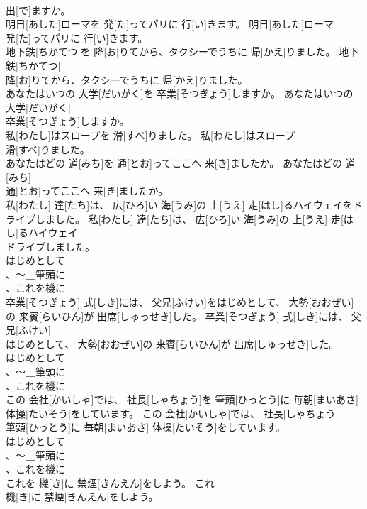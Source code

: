 \documentclass[8pt]{extreport}
\begin{document}
\begin{CJK}{UTF8}{min}
\\	出[で]ますか。	
\\	明日[あした]ローマを 発[た]ってパリに 行[い]きます。	明日[あした]ローマ
\\	発[た]ってパリに 行[い]きます。	
\\	地下鉄[ちかてつ]を 降[お]りてから、タクシーでうちに 帰[かえ]りました。	地下鉄[ちかてつ]
\\	降[お]りてから、タクシーでうちに 帰[かえ]りました。	
\\	あなたはいつの 大学[だいがく]を 卒業[そつぎょう]しますか。	あなたはいつの 大学[だいがく]
\\	卒業[そつぎょう]しますか。	
\\	私[わたし]はスロープを 滑[すべ]りました。	私[わたし]はスロープ
\\	滑[すべ]りました。	
\\	あなたはどの 道[みち]を 通[とお]ってここへ 来[き]ましたか。	あなたはどの 道[みち]
\\	通[とお]ってここへ 来[き]ましたか。	
\\	私[わたし] 達[たち]は、 広[ひろ]い 海[うみ]の 上[うえ] 走[はし]るハイウェイをドライブしました。	私[わたし] 達[たち]は、 広[ひろ]い 海[うみ]の 上[うえ] 走[はし]るハイウェイ
\\	ドライブしました。	
\\	はじめとして
\\	、～＿筆頭に
\\	、これを機に
\\	卒業[そつぎょう] 式[しき]には、 父兄[ふけい]をはじめとして、 大勢[おおぜい]の 来賓[らいひん]が 出席[しゅっせき]した。	卒業[そつぎょう] 式[しき]には、 父兄[ふけい]
\\	はじめとして、 大勢[おおぜい]の 来賓[らいひん]が 出席[しゅっせき]した。	
\\	はじめとして
\\	、～＿筆頭に
\\	、これを機に
\\	この 会社[かいしゃ]では、 社長[しゃちょう]を 筆頭[ひっとう]に 毎朝[まいあさ] 体操[たいそう]をしています。	この 会社[かいしゃ]では、 社長[しゃちょう]
\\	筆頭[ひっとう]に 毎朝[まいあさ] 体操[たいそう]をしています。	
\\	はじめとして
\\	、～＿筆頭に
\\	、これを機に
\\	これを 機[き]に 禁煙[きんえん]をしよう。	これ
\\	機[き]に 禁煙[きんえん]をしよう。	

\end{CJK}
\end{document}
